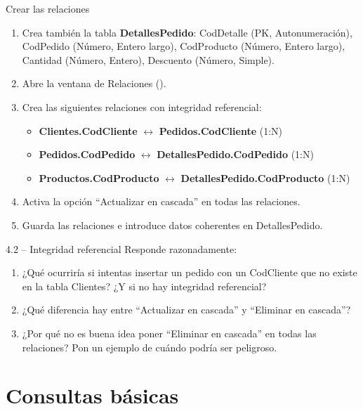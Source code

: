 \documentclass[12pt,a4paper]{article}
\begin{document}
\begin{practica}{Crear las relaciones}
\begin{enumerate}
  \item Crea también la tabla \textbf{DetallesPedido}: CodDetalle (PK, Autonumeración), CodPedido (Número, Entero largo), CodProducto (Número, Entero largo), Cantidad (Número, Entero), Descuento (Número, Simple).
  \item Abre la ventana de Relaciones ().
  \item Crea las siguientes relaciones con integridad referencial:
    \begin{itemize}
      \item \textbf{Clientes.CodCliente} $\leftrightarrow$ \textbf{Pedidos.CodCliente} (1:N)
      \item \textbf{Pedidos.CodPedido} $\leftrightarrow$ \textbf{DetallesPedido.CodPedido} (1:N)
      \item \textbf{Productos.CodProducto} $\leftrightarrow$ \textbf{DetallesPedido.CodProducto} (1:N)
    \end{itemize}
  \item Activa la opción ``Actualizar en cascada'' en todas las relaciones.
  \item Guarda las relaciones e introduce datos coherentes en DetallesPedido.
\end{enumerate}
\end{practica}

\begin{ejercicio}{4.2 -- Integridad referencial}
Responde razonadamente:
\begin{enumerate}[label=\alph*)]
  \item ¿Qué ocurriría si intentas insertar un pedido con un CodCliente que no existe en la tabla Clientes? ¿Y si no hay integridad referencial?
  \item ¿Qué diferencia hay entre ``Actualizar en cascada'' y ``Eliminar en cascada''?
  \item ¿Por qué no es buena idea poner ``Eliminar en cascada'' en todas las relaciones? Pon un ejemplo de cuándo podría ser peligroso.
\end{enumerate}
\end{ejercicio}

\section{Consultas básicas}
\end{document}
